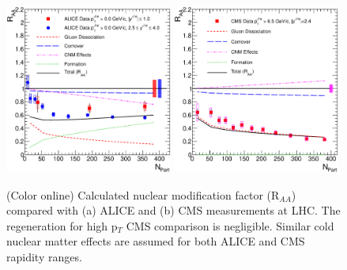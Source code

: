 \documentclass[aps,prc,preprint,superscriptaddress,showpacs,showkeys]{revtex4-1}
\begin{document}
\begin{figure}
\includegraphics[width=0.49\textwidth]{Figures/Fig6a_ALICE_RAANPart.eps}
\includegraphics[width=0.49\textwidth]{Figures/Fig6b_CMS_RAANPart.eps}
\caption{(Color online) Calculated nuclear modification factor (R$_{AA}$) compared with (a) ALICE and 
(b) CMS measurements at LHC. The regeneration for high p$_{T}$ CMS comparison is negligible. 
Similar cold nuclear matter effects are assumed for both ALICE and CMS rapidity ranges.}
\label{fig:JPsiRaa}
\end{figure}
\end{document}
